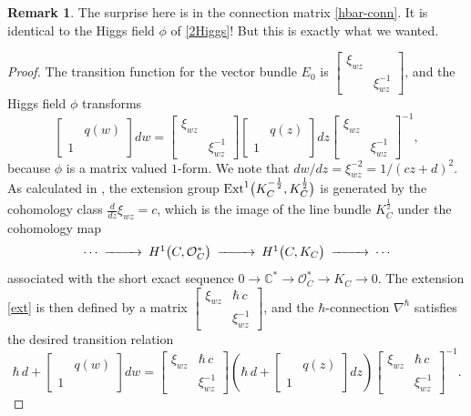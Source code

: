 \documentclass{amsart}
\theoremstyle{definition}
\newtheorem{rem}[thm]{Remark}
\numberwithin{equation}{section}
\numberwithin{figure}{section}
\def\Ext{{\text{\rm{Ext}}}}
\newcommand{\bC}{{\mathbb{C}}}
\newcommand{\cO}{{\mathcal{O}}}
\newcommand{\half}{{\frac{1}{2}}}
\newcommand{\lrar}{\longrightarrow}
\begin{document}
\begin{rem}
The surprise here is in the connection matrix
\eqref{hbar-conn}. It is identical to 
the Higgs field $\phi$ of \eqref{2Higgs}! But this is exactly what 
we wanted.  
\end{rem}

\begin{proof}
The transition function for the vector bundle $E_0$ is
$\begin{bmatrix} 
\xi_{wz}\\
&\xi_{wz}^{-1}
\end{bmatrix}
$, and the Higgs field $\phi$ transforms
$$
\begin{bmatrix} 
&q(w)\\
1&
\end{bmatrix}dw = 
\begin{bmatrix} 
\xi_{wz}\\
&\xi_{wz}^{-1}
\end{bmatrix}
\begin{bmatrix} 
&q(z)\\
1&
\end{bmatrix}dz
\begin{bmatrix} 
\xi_{wz}\\
&\xi_{wz}^{-1}
\end{bmatrix}^{-1},
$$
because $\phi$ is a matrix valued $1$-form. 
We note that $dw/dz = \xi_{wz}^{-2}=1/(cz+d)^2$.
As calculated in \cite[Section~3.1]{OM5}, 
the extension group $\Ext^1\big(K_C^{-\half}, K_C^{\half}
\big)$ is generated by the cohomology class $\frac{d}{dz}\xi_{wz} = c$,
which is the image of the line bundle $K_C^\half$ under the cohomology 
map
$$
\begin{CD}
\cdots @>>> H^1\big(C, \cO_C^*\big) @>>> H^1\big(C,K_C\big)@>>>
\cdots 
\end{CD}
$$
associated with the short exact sequence $0\lrar \bC^*\lrar 
\cO_C^*\lrar K_C\lrar 0$. The extension \eqref{ext}
is then defined by a matrix 
$\begin{bmatrix} 
\xi_{wz}&\hbar\, c\\
&\xi_{wz}^{-1}
\end{bmatrix}
$, and the $\hbar$-connection $\nabla^\hbar$ satisfies the desired transition relation
$$
\hbar \,d+\begin{bmatrix} 
&q(w)\\
1&
\end{bmatrix}dw = 
\begin{bmatrix} 
\xi_{wz}&\hbar \, c\\
&\xi_{wz}^{-1}
\end{bmatrix}
\left(\hbar \,d+\begin{bmatrix} 
&q(z)\\
1&
\end{bmatrix}dz
\right)
\begin{bmatrix} 
\xi_{wz}&\hbar \, c\\
&\xi_{wz}^{-1}
\end{bmatrix}^{-1}.
$$
\end{proof}
\end{document}
